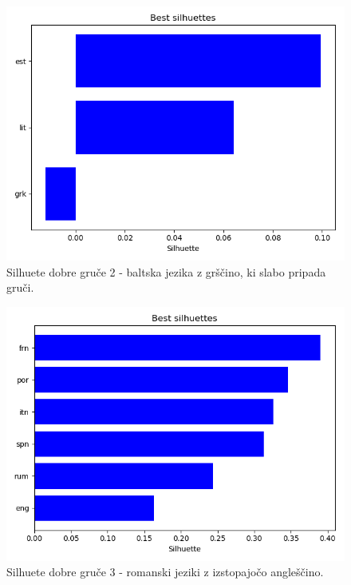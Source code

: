 \documentclass[a4paper,11pt]{article}
\begin{document}
\begin{figure}[htbp]
	\begin{center}
		\includegraphics[scale=0.5]{best2.png}
		\caption{Silhuete dobre gruče 2 - baltska jezika z grščino, ki slabo pripada gruči.}
		\label{slika1}
	\end{center}
\end{figure}

\begin{figure}[htbp]
	\begin{center}
		\includegraphics[scale=0.5]{best3.png}
		\caption{Silhuete dobre gruče 3 - romanski jeziki z izstopajočo angleščino.}
		\label{slika1}
	\end{center}
\end{figure}
\end{document}
